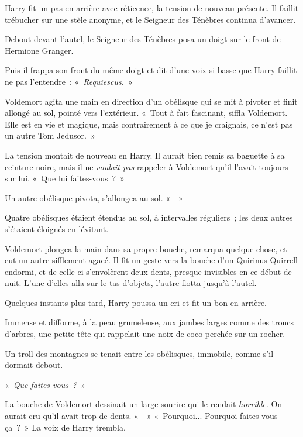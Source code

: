 Harry fit un pas en arrière avec réticence, la tension de nouveau présente.
Il faillit trébucher sur une stèle anonyme, et le Seigneur des Ténèbres continua d'avancer.

Debout devant l'autel, le Seigneur des Ténèbres posa un doigt sur le front de Hermione Granger.

Puis il frappa son front du même doigt et dit d'une voix si basse que Harry faillit ne pas l'entendre~: «~\emph{Requiescus.}~»

Voldemort agita une main en direction d'un obélisque qui se mit à pivoter et finit allongé au sol, pointé vers l'extérieur.
«~Tout à fait fascinant, siffla Voldemort.
Elle est en vie et magique, mais contrairement à ce que je craignais, ce n'est pas un autre Tom Jedusor.~»

La tension montait de nouveau en Harry.
Il aurait bien remis sa baguette à sa ceinture noire, mais il ne \emph{voulait pas} rappeler à Voldemort qu'il l'avait toujours sur lui.
«~Que lui faites-vous~?~»

Un autre obélisque pivota, s'allongea au sol.
«~~»

Quatre obélisques étaient étendus au sol, à intervalles réguliers~; les deux autres s'étaient éloignés en lévitant.

Voldemort plongea la main dans sa propre bouche, remarqua quelque chose, et eut un autre sifflement agacé.
Il fit un geste vers la bouche d'un Quirinus Quirrell endormi, et de celle-ci s'envolèrent deux dents, presque invisibles en ce début de nuit.
L'une d'elles alla sur le tas d'objets, l'autre flotta jusqu'à l'autel.

Quelques instants plus tard, Harry poussa un cri et fit un bon en arrière.

Immense et difforme, à la peau grumeleuse, aux jambes larges comme des troncs d'arbres, une petite tête qui rappelait une noix de coco perchée sur un rocher.

Un troll des montagnes se tenait entre les obélisques, immobile, comme s'il dormait debout.

«~\emph{Que faites-vous~?}~»

La bouche de Voldemort dessinait un large sourire qui le rendait \emph{horrible}.
On aurait cru qu'il avait trop de dents.
«~~»
«~Pourquoi...
Pourquoi faites-vous ça~?~»
La voix de Harry trembla.


